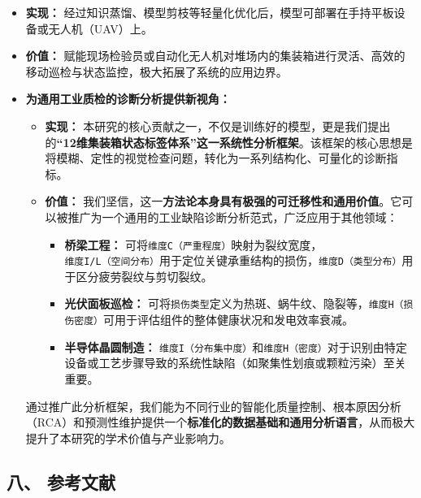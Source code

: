 \documentclass[
]{article}
\begin{document}
\begin{itemize}
  \begin{itemize}
  \item
    \textbf{实现：}
    经过知识蒸馏、模型剪枝等轻量化优化后，模型可部署在手持平板设备或无人机（UAV）上。
  \item
    \textbf{价值：}
    赋能现场检验员或自动化无人机对堆场内的集装箱进行灵活、高效的移动巡检与状态监控，极大拓展了系统的应用边界。
  \end{itemize}
\end{itemize}

\begin{itemize}
\item
  \textbf{为通用工业质检的诊断分析提供新视角：}

  \begin{itemize}
  \item
    \textbf{实现：}
    本研究的核心贡献之一，不仅是训练好的模型，更是我们提出的\textbf{``12维集装箱状态标签体系''这一系统性分析框架}。该框架的核心思想是将模糊、定性的视觉检查问题，转化为一系列结构化、可量化的诊断指标。
  \item
    \textbf{价值：}
    我们坚信，这一\textbf{方法论本身具有极强的可迁移性和通用价值}。它可以被推广为一个通用的工业缺陷诊断分析范式，广泛应用于其他领域：

    \begin{itemize}
    \item
      \textbf{桥梁工程：}
      可将\texttt{维度C（严重程度）}映射为裂纹宽度，\texttt{维度I/L（空间分布）}用于定位关键承重结构的损伤，\texttt{维度D（类型分布）}用于区分疲劳裂纹与剪切裂纹。
    \item
      \textbf{光伏面板巡检：}
      可将\texttt{损伤类型}定义为热斑、蜗牛纹、隐裂等，\texttt{维度H（损伤密度）}可用于评估组件的整体健康状况和发电效率衰减。
    \item
      \textbf{半导体晶圆制造：}
      \texttt{维度I（分布集中度）}和\texttt{维度H（密度）}对于识别由特定设备或工艺步骤导致的系统性缺陷（如聚集性划痕或颗粒污染）至关重要。
    \end{itemize}
  \end{itemize}

  通过推广此分析框架，我们能为不同行业的智能化质量控制、根本原因分析（RCA）和预测性维护提供一个\textbf{标准化的数据基础和通用分析语言}，从而极大提升了本研究的学术价值与产业影响力。
\end{itemize}

\subsection{\texorpdfstring{\textbf{八、
参考文献}}{八、 参考文献}}\label{ux516b-ux53c2ux8003ux6587ux732e}
\end{document}
